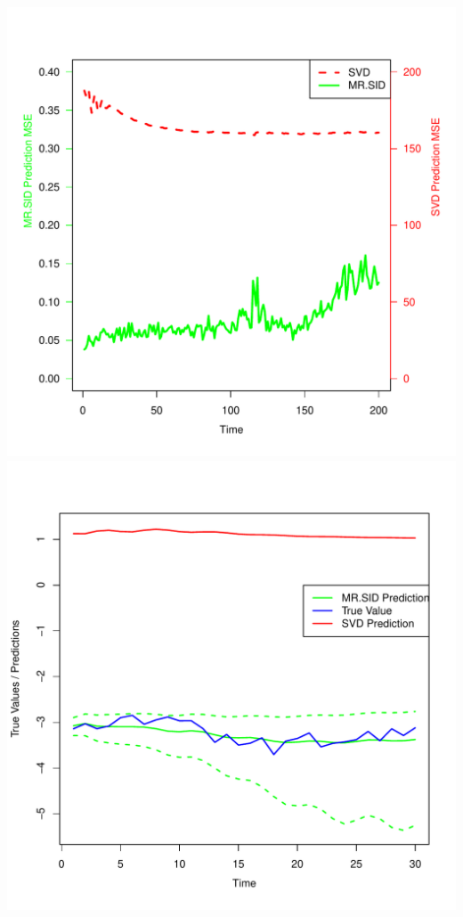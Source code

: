 \documentclass[fleqn,12pt]{article}
\begin{document}
\begin{center}
\includegraphics[scale=0.45]{./figures/hcp_pred_accy.pdf}
\includegraphics[scale=0.45]{./figures/newSampleTS.pdf}

\end{center}
\end{document}
